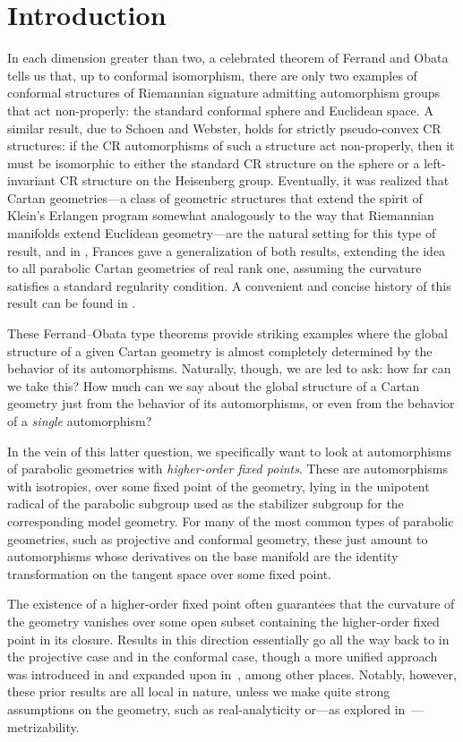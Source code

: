 \documentclass[pdftex]{sigma}
\numberwithin{equation}{section}
\theoremstyle{definition}
\begin{document}
\section{Introduction}
In each dimension greater than two, a celebrated theorem of Ferrand and Obata tells us that, up to conformal isomorphism, there are only two examples of conformal structures of Riemannian signature admitting automorphism groups that act non-properly: the standard conformal sphere and Euclidean space. A similar result, due to Schoen and Webster, holds for strictly pseudo-convex CR structures: if the CR automorphisms of such a structure act non-properly, then it must be isomorphic to either the standard CR structure on the sphere or a left-invariant CR structure on the Heisenberg group. Eventually, it was realized that Cartan geometries---a class of geometric structures that extend the spirit of Klein's Erlangen program somewhat analogously to the way that Riemannian manifolds extend Euclidean geometry---are the natural setting for this type of result, and in \cite{Frances2007}, Frances gave a generalization of both results, extending the idea to all parabolic Cartan geometries of real rank one, assuming the curvature satisfies a standard regularity condition. A convenient and concise history of this result can be found in \cite{MelnickFO}.

\!These Ferrand--Obata type theorems provide striking examples where the global structure of a given Cartan geometry is almost completely determined by the behavior of its automorphisms. Naturally, though, we are led to ask: how far can we take this? How much can we say about the global structure of a Cartan geometry just from the behavior of its automorphisms, or even from the behavior of a \textit{single} automorphism?

In the vein of this latter question, we specifically want to look at automorphisms of parabolic geometries with \textit{higher-order fixed points}. These are automorphisms with isotropies, over some fixed point of the geometry, lying in the unipotent radical of the parabolic subgroup used as the stabilizer subgroup for the corresponding model geometry. For many of the most common types of parabolic geometries, such as projective and conformal geometry, these just amount to automorphisms whose derivatives on the base manifold are the identity transformation on the tangent space over some fixed point.

The existence of a higher-order fixed point often guarantees that the curvature of the geometry vanishes over some open subset containing the higher-order fixed point in its closure. Results in this direction essentially go all the way back to \cite{NaganoOchiai} in the projective case and \cite{Frances2012} in the conformal case, though a more unified approach was introduced in \cite{CapMelnick2013} and expanded upon in~\cite{KruglikovThe2018,MelnickNeusser2016}, among other places. Notably, however, these prior results are all local in nature, unless we make quite strong assumptions on the geometry, such as real-analyticity or---as explored in~\cite{TianyuMa, NaganoOchiai}---metrizability.
\end{document}
